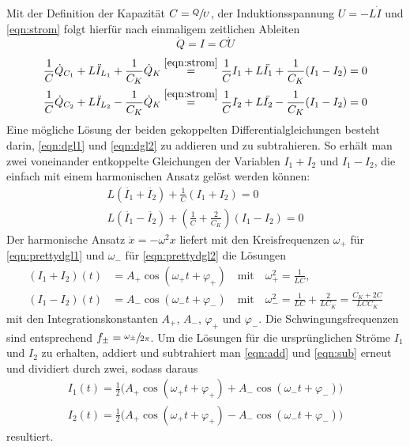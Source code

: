 Mit der Definition der Kapazität ${C=\sfrac{Q}{U}}$, der Induktionsspannung ${U=- L \dot{I}}$ und \eqref{eqn:strom} folgt 
hierfür nach einmaligem zeitlichen Ableiten 
\begin{equation}
    \dot{Q} = I = C \dot{U} 
\end{equation}
\begin{align}
    \frac{1}{C} \dot{Q}_{C_1} + L \ddot{I}_{L_1} + \frac{1}{C_K} \dot{Q}_{K} \stackrel{\eqref{eqn:strom}}{=} 
    \frac{1}{C} I_1 + L \ddot{I_1} + \frac{1}{C_K} (I_1 - I_2) = 0 \label{eqn:dgl1} \\
    \frac{1}{C} \dot{Q}_{C_2} + L \ddot{I}_{L_2} - \frac{1}{C_K} \dot{Q}_{K} \stackrel{\eqref{eqn:strom}}{=}
    \frac{1}{C} I_2 + L \ddot{I_2} - \frac{1}{C_K} (I_1 - I_2) = 0 \label{eqn:dgl2}
\end{align}
Eine mögliche Lösung der beiden gekoppelten Differentialgleichungen besteht darin, \eqref{eqn:dgl1} und \eqref{eqn:dgl2}
zu addieren und zu subtrahieren. So erhält man zwei voneinander entkoppelte Gleichungen der Variablen ${I_1 + I_2}$ und ${I_1 - I_2}$, 
die einfach mit einem harmonischen Ansatz gelöst werden können:
\begin{align}
    L (\ddot{I_1} + \ddot{I_2}) + \frac{1}{C} (I_1+I_2)=0 \label{eqn:prettydgl1} \\
    L (\ddot{I_1} - \ddot{I_2}) + (\frac{1}{C} + \frac{2}{C_K}) (I_1-I_2)=0 \label{eqn:prettydgl2}
\end{align}
Der harmonische Ansatz ${\ddot{x} = -\omega ^2 x}$ liefert mit den Kreisfrequenzen $\omega _+$ für \eqref{eqn:prettydgl1} 
und $\omega _-$ für \eqref{eqn:prettydgl2} die Lösungen 
\begin{align}
    (I_1+I_2)(t) &= A_+ \cos(\omega _+ t + \varphi _+) \quad \text{mit} \quad \omega _+ ^2= \frac{1}{LC} ,
    \label{eqn:add} \\
    (I_1-I_2)(t) &= A_- \cos(\omega _- t + \varphi _-) \quad \text{mit} \quad \omega _- ^2= \frac{1}{LC} + \frac{2}{LC_K} = \frac{C_K + 2C}{LCC_K} 
    \label{eqn:sub}
\end{align}
mit den Integrationskonstanten $A_+$, $A_-$, $\varphi _+$ und $\varphi _-$.
Die Schwingungsfrequenzen sind entsprechend $f_{\pm}=\sfrac{\omega _{\pm}}{2\pi}$.
Um die Lösungen für die ursprünglichen Ströme $I_1$ und $I_2$ zu erhalten, addiert und subtrahiert man \eqref{eqn:add} 
und \eqref{eqn:sub} erneut und dividiert durch zwei, sodass daraus 
\begin{align}
    I_1 (t) = \frac{1}{2} \bigl(A_+ \cos(\omega _+ t + \varphi _+) + A_- \cos(\omega _- t + \varphi _-)\bigr) \\
    I_2 (t) = \frac{1}{2} \bigl(A_+ \cos(\omega _+ t + \varphi _+) - A_- \cos(\omega _- t + \varphi _-)\bigr)
\end{align}
resultiert.

